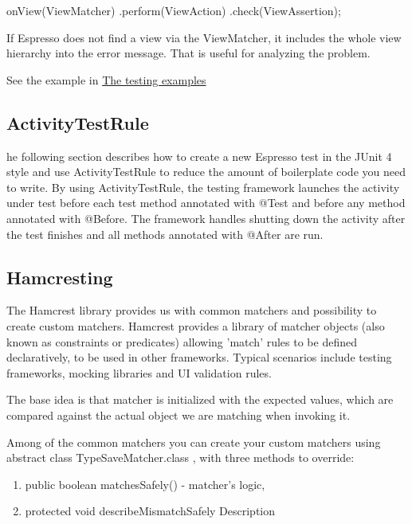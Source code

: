 \begin{android}
onView(ViewMatcher)       
.perform(ViewAction)     
.check(ViewAssertion);
\end{android}

If Espresso does not find a view via the ViewMatcher, it includes the whole view hierarchy into the error message. That is useful for analyzing the problem.

See the example in \href{https://github.com/googlesamples/android-testing}{The testing examples}


\subsection{ActivityTestRule}
he following section describes how to create a new Espresso test in the JUnit 4 style and use ActivityTestRule to reduce the amount of boilerplate code you need to write. By using ActivityTestRule, the testing framework launches the activity under test before each test method annotated with @Test and before any method annotated with @Before. The framework handles shutting down the activity after the test finishes and all methods annotated with @After are run.



\subsection{Hamcresting}
 The Hamcrest library provides us with common matchers and possibility to create custom matchers. Hamcrest provides a library of matcher objects (also known as constraints or predicates) allowing 'match' rules to be defined declaratively, to be used in other frameworks. Typical scenarios include testing frameworks, mocking libraries and UI validation rules.
 
 The base idea is that matcher is initialized with the expected values, which are compared against the actual object we are matching when invoking it.
 
 Among of the common matchers you can create your custom matchers using abstract class TypeSaveMatcher.class , with three methods to override:
 
 \begin{enumerate}
 	\item public boolean matchesSafely() - matcher's logic,
 	\item protected void describeMismatchSafely Description 
 \end{enumerate}

